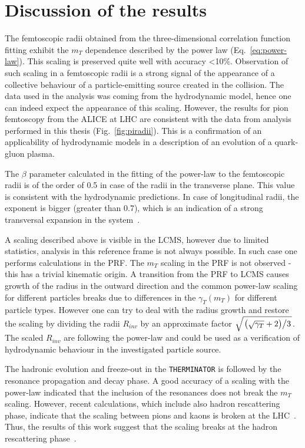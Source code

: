 

      \FloatBarrier
  \section{Discussion of the results}
    The femtoscopic radii obtained from the three-dimensional correlation function fitting exhibit the $m_T$ dependence described by the power law (Eq.~\ref{eq:power-law}).
    This scaling is preserved quite well with accuracy <10\%.
    Observation of such scaling in a femtoscopic radii is a strong signal of the appearance of a collective behaviour of a particle-emitting source created in the collision.
    The data used in the analysis was coming from the hydrodynamic model, hence one can indeed expect the appearance of this scaling.
    However, the results for pion femtoscopy from the ALICE at LHC are consistent with the data from analysis performed in this thesis (Fig.~\ref{fig:piradii}).
    This is a confirmation of an applicability of hydrodynamic models in a description of an evolution of a quark-gluon plasma.

    The $\beta$ parameter calculated in the fitting of the power-law to the femtoscopic radii is of the order of 0.5 in case of the radii in the transverse plane.
    This value is consistent with the hydrodynamic predictions.
    In case of longitudinal radii, the exponent is bigger (greater than 0.7), which is an indication of a strong transversal expansion in the system~\cite{akkelin_sinyukov}.

    A scaling described above is visible in the LCMS, however due to limited statistics, analysis in this reference frame is not always possible.
    In such case one performs calculations in the PRF.
    The $m_T$ scaling in the PRF is not observed - this has a trivial kinematic origin.
    A transition from the PRF to LCMS causes growth of the radius in the outward direction and the common power-law scaling for different particles breaks due to differences in the $\gamma_T (m_T)$ for different particle types.
    However one can try to deal with the radius growth and restore the scaling by dividing the radii $R_{inv}$ by an approximate factor $\sqrt{ \left. \left( \sqrt{\gamma_T} + 2 \right) \middle/ 3 \right. }$.
    The scaled $R_{inv}$ are following the power-law and could be used as a verification of hydrodynamic behaviour in the investigated particle source.

    The hadronic evolution and freeze-out in the \verb|THERMINATOR| is followed by the resonance propagation and decay phase.
    A good accuracy of a scaling with the power-law indicated that the inclusion of the resonances does not break the $m_T$ scaling.
    However, recent calculations, which include also hadron rescattering phase, indicate that the scaling between pions and kaons is broken at the LHC~\cite{sinyukov_kaon}.
    Thus, the results of this work suggest that the scaling breaks at the hadron rescattering phase~\cite{galazyn}.
